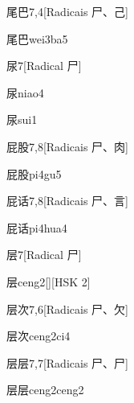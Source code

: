 \begin{entry}{尾巴}{7,4}[Radicais ⼫、⼰]
  \begin{phonetics}{尾巴}{wei3ba5}
  \end{phonetics}
\end{entry}

\begin{entry}{尿}{7}[Radical ⼫]
  \begin{phonetics}{尿}{niao4}
  \end{phonetics}
  \begin{phonetics}{尿}{sui1}
  \end{phonetics}
\end{entry}

\begin{entry}{屁股}{7,8}[Radicais ⼫、⾁]
  \begin{phonetics}{屁股}{pi4gu5}
  \end{phonetics}
\end{entry}

\begin{entry}{屁话}{7,8}[Radicais ⼫、⾔]
  \begin{phonetics}{屁话}{pi4hua4}
  \end{phonetics}
\end{entry}

\begin{entry}{层}{7}[Radical ⼫]
  \begin{phonetics}{层}{ceng2}[][HSK 2]
  \end{phonetics}
\end{entry}

\begin{entry}{层次}{7,6}[Radicais ⼫、⽋]
  \begin{phonetics}{层次}{ceng2ci4}
  \end{phonetics}
\end{entry}

\begin{entry}{层层}{7,7}[Radicais ⼫、⼫]
  \begin{phonetics}{层层}{ceng2ceng2}
  \end{phonetics}
\end{entry}

